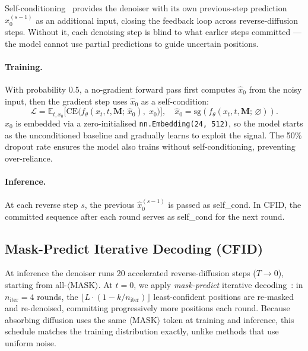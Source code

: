 \documentclass[11pt]{article}
\begin{document}
Self-conditioning~\cite{chen2022,mdlm} provides the denoiser with its own previous-step
prediction $\hat{x}_0^{(s-1)}$ as an additional input, closing the feedback loop
across reverse-diffusion steps. Without it, each denoising step is blind to what
earlier steps committed --- the model cannot use partial predictions to guide
uncertain positions.

\paragraph{Training.}
With probability 0.5, a no-gradient forward pass first computes $\hat{x}_0$ from
the noisy input, then the gradient step uses $\hat{x}_0$ as a self-condition:
\begin{equation}
  \mathcal{L} = \mathbb{E}_{t,x_0}\bigl[
    \mathrm{CE}\bigl(f_\theta(x_t, t, \mathbf{M};\,\hat{x}_0),\; x_0\bigr)
  \bigr], \quad \hat{x}_0 = \mathrm{sg}(f_\theta(x_t,t,\mathbf{M};\,\varnothing)).
\end{equation}
$\hat{x}_0$ is embedded via a zero-initialised \texttt{nn.Embedding(24,\,512)},
so the model starts as the unconditioned baseline and gradually learns to exploit
the signal. The 50\% dropout rate ensures the model also trains without
self-conditioning, preventing over-reliance.

\paragraph{Inference.}
At each reverse step $s$, the previous $\hat{x}_0^{(s-1)}$ is passed as
self\_cond. In CFID, the committed sequence after each round serves as
self\_cond for the next round.

\subsection{Mask-Predict Iterative Decoding (CFID)}

At inference the denoiser runs 20 accelerated reverse-diffusion steps ($T\to0$),
starting from all-$\langle\text{MASK}\rangle$. At $t=0$, we apply
\emph{mask-predict} iterative decoding~\cite{d3pm}: in $n_\text{iter}=4$ rounds,
the $\lfloor L\cdot(1 - k/n_\text{iter})\rfloor$ least-confident positions are
re-masked and re-denoised, committing progressively more positions each round.
Because absorbing diffusion uses the same $\langle\text{MASK}\rangle$ token at
training and inference, this schedule matches the training distribution exactly,
unlike methods that use uniform noise.
\end{document}
